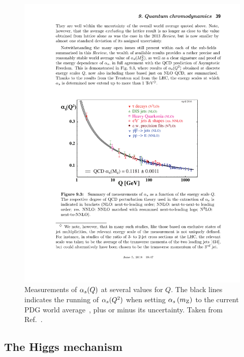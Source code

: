 \begin{figure}[hbtp]
  \begin{center}
    \includegraphics[width=0.7\linewidth]{img/theory/alphasscaling.pdf}
    \caption{
        Measurements of $\alpha_s(Q)$ at several values for $Q$.
        The black lines indicates the running of $\alpha_s(Q^2)$ when setting $\alpha_s \left( m_\mathrm{Z} \right) $ to the current PDG world average~\cite{pdg}, plus or minus its uncertainty.
        Taken from Ref.~\cite{pdg}.
        }
    \label{fig:alphasscaling}
  \end{center}
\end{figure}



\subsection{The Higgs mechanism}

